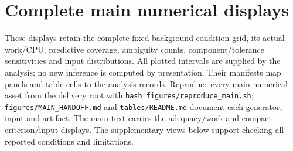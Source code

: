 \section{Complete main numerical displays}
\label{app:numerical}

These displays retain the complete fixed-background condition grid, its actual work/CPU, predictive coverage, ambiguity counts, component/tolerance sensitivities and input distributions. All plotted intervals are supplied by the analysis; no new inference is computed by presentation. Their manifests map panels and table cells to the analysis records. Reproduce every main numerical asset from the delivery root with \texttt{bash figures/reproduce\_main.sh}; \texttt{figures/MAIN\_HANDOFF.md} and \texttt{tables/README.md} document each generator, input and artifact. The main text carries the adequacy/work and compact criterion/input displays. The supplementary views below support checking all reported conditions and limitations.

